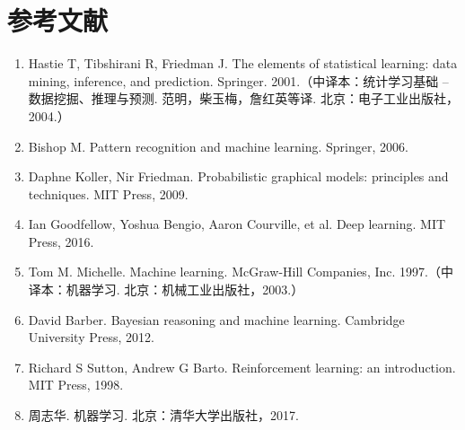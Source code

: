 \documentclass[UTF8,12pt,a4paper,fontset=fandol]{ctexart}
\begin{document}
\section*{参考文献}

\begin{enumerate}
  \item Hastie T, Tibshirani R, Friedman J. The elements of statistical learning: data mining, inference, and prediction. Springer. 2001.（中译本：统计学习基础 -- 数据挖掘、推理与预测. 范明，柴玉梅，詹红英等译. 北京：电子工业出版社，2004.）
  \item Bishop M. Pattern recognition and machine learning. Springer, 2006.
  \item Daphne Koller, Nir Friedman. Probabilistic graphical models: principles and techniques. MIT Press, 2009.
  \item Ian Goodfellow, Yoshua Bengio, Aaron Courville, et al. Deep learning. MIT Press, 2016.
  \item Tom M. Michelle. Machine learning. McGraw-Hill Companies, Inc. 1997.（中译本：机器学习. 北京：机械工业出版社，2003.）
  \item David Barber. Bayesian reasoning and machine learning. Cambridge University Press, 2012.
  \item Richard S Sutton, Andrew G Barto. Reinforcement learning: an introduction. MIT Press, 1998.
  \item 周志华. 机器学习. 北京：清华大学出版社，2017.
\end{enumerate}
\end{document}
